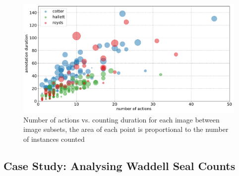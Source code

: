 \begin{figure}[ht]
\centering
\includegraphics[width=1.0\linewidth]{charts/aerial_penguins/actions_time_a.pdf}
\caption{ Number of actions vs. counting duration for each image between image subsets, the area of each point is proportional to the number of instances counted }
\label{fig:actions_time_penguins}
\end{figure}


\subsection{Case Study: Analysing Waddell Seal Counts}
\label{sec:case_seals}


